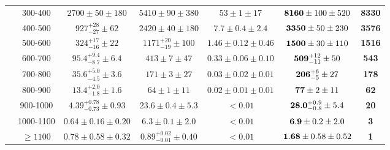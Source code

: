 \begin{table}[!ht]
{\begin{tabular}{c|c||c|c|c|c|c}
 & 300-400 & $2700\pm50\pm180$ & $5410\pm90\pm380$ & $53\pm1\pm17$ & ${\bf 8160}\pm100\pm520$ & {\bf 8330}\\ 
 & 400-500 & $927^{+28}_{-27}\pm62$ & $2420\pm40\pm180$ & $7.7\pm0.4\pm2.4$ & ${\bf 3350}\pm50\pm230$ & {\bf 3576}\\ 
 & 500-600 & $324^{+17}_{-16}\pm22$ & $1171^{+20}_{-19}\pm100$ & $1.46\pm0.12\pm0.46$ & ${\bf 1500}\pm30\pm110$ & {\bf 1516}\\ 
 & 600-700 & $95.4^{+9.4}_{-8.7}\pm6.4$ & $413\pm7\pm47$ & $0.33\pm0.06\pm0.10$ & ${\bf 509}^{+12}_{-11}\pm50$ & {\bf 543}\\ 
 & 700-800 & $35.6^{+5.0}_{-4.5}\pm3.6$ & $171\pm3\pm27$ & $0.03\pm0.02\pm0.01$ & ${\bf 206}^{+6}_{-5}\pm27$ & {\bf 178}\\ 
 & 800-900 & $13.4^{+2.0}_{-1.8}\pm1.6$ & $64\pm1\pm11$ & $0.02\pm0.01\pm0.01$ & ${\bf 77}\pm2\pm11$ & {\bf 62}\\ 
 & 900-1000 & $4.39^{+0.78}_{-0.73}\pm0.93$ & $23.6\pm0.4\pm5.3$ & $<0.01$ & ${\bf 28.0}^{+0.9}_{-0.8}\pm5.4$ & {\bf 20}\\ 
 & 1000-1100 & $0.64\pm0.16\pm0.20$ & $6.3\pm0.1\pm2.0$ & $<0.01$ & ${\bf 6.9}\pm0.2\pm2.0$ & {\bf 3}\\ 
 & $\geq1100$ & $0.78\pm0.58\pm0.32$ & $0.89^{+0.02}_{-0.01}\pm0.40$ & $<0.01$ & ${\bf 1.68}\pm0.58\pm0.52$ & {\bf 1}\\ 

\hline
\end{tabular}}
\end{table}


